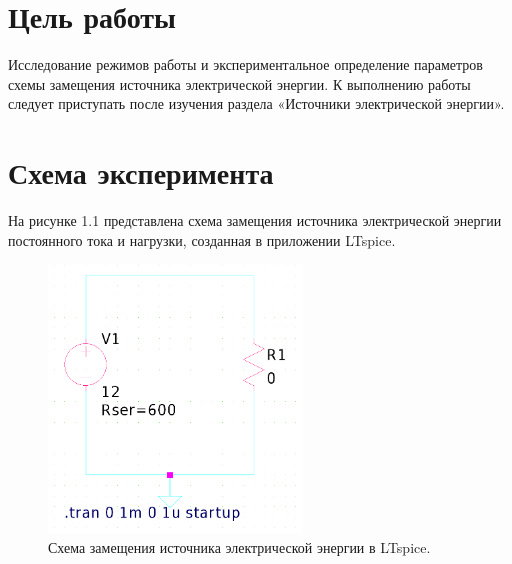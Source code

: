 \documentclass[a4paper]{article}
\begin{document}
\thispagestyle{empty}

\newpage
\pagestyle{plain}
\setcounter{page}{1}

\tableofcontents


\section*{Цель работы}
Исследование режимов работы и экспериментальное определение параметров схемы замещения источника электрической энергии. К выполнению работы следует приступать после изучения раздела «Источники электрической энергии».

\section{Схема эксперимента}
На рисунке 1.1 представлена схема замещения источника электрической энергии постоянного тока и нагрузки, созданная в приложении LTspice.

\begin{figure}[H]
	\centering
	\includegraphics[width=0.6\textwidth]{schema.png} %
	\caption{Схема замещения источника электрической энергии в LTspice.}
\end{figure}




\end{document}
